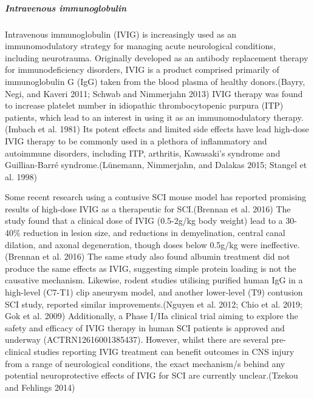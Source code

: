 \documentclass[9pt,lineno]{elife}
\begin{document}
\begin{landscape}
\begin{landscape}
\hypertarget{intravenous-immunoglobulin}{%
\subparagraph{Intravenous immunoglobulin}\label{intravenous-immunoglobulin}}

Intravenous immunoglobulin (IVIG) is increasingly used as an immunomodulatory strategy for managing acute neurological conditions, including neurotrauma.
Originally developed as an antibody replacement therapy for immunodeficiency disorders, IVIG is a product comprised primarily of immunoglobulin G (IgG) taken from the blood plasma of healthy donors.(Bayry, Negi, and Kaveri 2011; Schwab and Nimmerjahn 2013) IVIG therapy was found to increase platelet number in idiopathic thrombocytopenic purpura (ITP) patients, which lead to an interest in using it as an immunomodulatory therapy.(Imbach et al. 1981) Its potent effects and limited side effects have lead high-dose IVIG therapy to be commonly used in a plethora of inflammatory and autoimmune disorders, including ITP, arthritis, Kawasaki's syndrome and Guillian-Barré syndrome.(Lünemann, Nimmerjahn, and Dalakas 2015; Stangel et al. 1998)

Some recent research using a contusive SCI mouse model has reported promising results of high-dose IVIG as a therapeutic for SCI.(Brennan et al. 2016) The study found that a clinical dose of IVIG (0.5-2g/kg body weight) lead to a 30-40\% reduction in lesion size, and reductions in demyelination, central canal dilation, and axonal degeneration, though doses below 0.5g/kg were ineffective.(Brennan et al. 2016) The same study also found albumin treatment did not produce the same effects as IVIG, suggesting simple protein loading is not the causative mechanism. Likewise, rodent studies utilising purified human IgG in a high-level (C7-T1) clip aneurysm model, and another lower-level (T9) contusion SCI study, reported similar improvements.(Nguyen et al. 2012; Chio et al. 2019; Gok et al. 2009) Additionally, a Phase I/IIa clinical trial aiming to explore the safety and efficacy of IVIG therapy in human SCI patients is approved and underway (ACTRN12616001385437).
However, whilst there are several pre-clinical studies reporting IVIG treatment can benefit outcomes in CNS injury from a range of neurological conditions, the exact mechanism/s behind any potential neuroprotective effects of IVIG for SCI are currently unclear.(Tzekou and Fehlings 2014)


\end{landscape}
\end{landscape}
\end{document}
